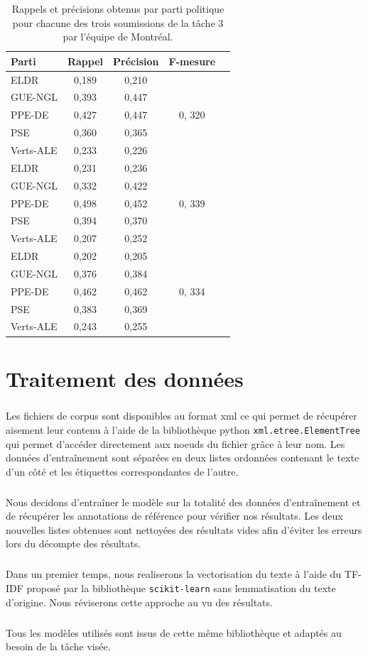 \documentclass[11pt]{article}
\begin{document}
 \begin{table}[h]
 \begin{tabular}{lcccc}
 \hline
 Parti & Rappel & Précision & F-mesure\\
 \hline
 ELDR & 0,189 & 0,210 &\multirow{5}{*}{0, 320}\\
 GUE-NGL & 0,393 & 0,447\\
 PPE-DE & 0,427 & 0,447\\
 PSE & 0,360 & 0,365 \\
 Verts-ALE & 0,233 & 0,226\\
 \hline
 ELDR & 0,231 & 0,236 &\multirow{5}{*}{0, 339}\\
 GUE-NGL & 0,332 & 0,422\\
 PPE-DE & 0,498 & 0,452\\
 PSE & 0,394 & 0,370 \\
 Verts-ALE & 0,207 & 0,252\\
 \hline
  ELDR & 0,202 & 0,205 &\multirow{5}{*}{0, 334}\\
 GUE-NGL & 0,376 & 0,384\\
 PPE-DE & 0,462 & 0,462\\
 PSE & 0,383 & 0,369 \\
 Verts-ALE & 0,243 & 0,255\\
 \hline
 \end{tabular}
 \caption{Rappels et précisions obtenus par parti politique pour chacune des trois soumissions de la tâche 3 par l’équipe de Montréal.}
 \label{tab:etatArt}
 \end{table}

\section{Traitement des données}

\subparagraph{}
Les fichiers de corpus sont disponibles au format xml ce qui permet de récupérer aisement leur contenu à l'aide de la bibliothèque python \texttt{xml.etree.ElementTree} qui permet d'accéder directement aux noeuds du fichier grâce à leur nom. Les données d'entraînement sont séparées en deux listes ordonnées contenant le texte d'un côté et les étiquettes correspondantes de l'autre.
\subparagraph{}
Nous decidons d'entraîner le modèle sur la totalité des données d'entraînement et de récupérer les annotations de référence pour vérifier nos résultats. Les deux nouvelles listes obtenues sont nettoyées des résultats vides afin d'éviter les erreurs lors du décompte des résultats.
\subparagraph{}
Dans un premier temps, nous realiserons la vectorisation du texte à l'aide du TF-IDF proposé par la bibliothèque \texttt{scikit-learn} sans lemmatisation du texte d'origine. Nous réviserons cette approche au vu des résultats.
\subparagraph{}
Tous les modèles utilisés sont issus de cette même bibliothèque et adaptés au besoin de la tâche visée.
\end{document}
